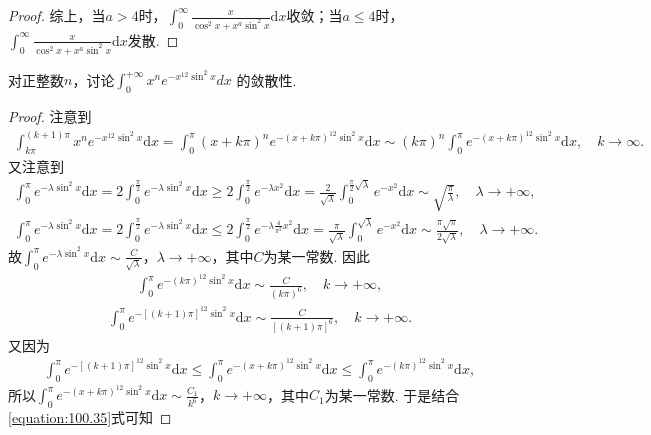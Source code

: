 \documentclass[../../main.tex]{subfiles}
\begin{document}
\begin{proof}
综上，当$a>4$时，$\int_0^{\infty}\frac{x}{\cos^2x+x^a\sin^2x}\mathrm{d}x$收敛；当$a\leqslant 4$时，$\int_0^{\infty}\frac{x}{\cos^2x+x^a\sin^2x}\mathrm{d}x$发散.
\end{proof}

\begin{example}
对正整数\(n\)，讨论$\int_{0}^{+\infty}x^{n}e^{-x^{12}\sin^{2}x}dx$
的敛散性. 
\end{example}
\begin{proof}
注意到
\begin{align}\label{equation:100.35}
\int_{k\pi}^{(k+1)\pi}x^ne^{-x^{12}\sin^2x}\mathrm{d}x=\int_0^{\pi}(x+k\pi)^ne^{-(x+k\pi)^{12}\sin^2x}\mathrm{d}x\sim (k\pi)^n\int_0^{\pi}e^{-(x+k\pi)^{12}\sin^2x}\mathrm{d}x,\quad k\rightarrow \infty.
\end{align}
又注意到
\begin{align*}
\int_0^{\pi}e^{-\lambda \sin^2x}\mathrm{d}x=2\int_0^{\frac{\pi}{2}}e^{-\lambda \sin^2x}\mathrm{d}x\geqslant 2\int_0^{\frac{\pi}{2}}e^{-\lambda x^2}\mathrm{d}x=\frac{2}{\sqrt{\lambda}}\int_0^{\frac{\pi}{2}\sqrt{\lambda}}e^{-x^2}\mathrm{d}x\sim \sqrt{\frac{\pi}{\lambda}},\quad \lambda \rightarrow +\infty,
\end{align*}
\begin{align*}
\int_0^{\pi}e^{-\lambda \sin^2x}\mathrm{d}x=2\int_0^{\frac{\pi}{2}}e^{-\lambda \sin^2x}\mathrm{d}x\leqslant 2\int_0^{\frac{\pi}{2}}e^{-\lambda \frac{4}{\pi^2}x^2}\mathrm{d}x=\frac{\pi}{\sqrt{\lambda}}\int_0^{\sqrt{\lambda}}e^{-x^2}\mathrm{d}x\sim \frac{\pi \sqrt{\pi}}{2\sqrt{\lambda}},\quad \lambda \rightarrow +\infty.
\end{align*}
故$\int_0^{\pi}e^{-\lambda \sin^2x}\mathrm{d}x\sim \frac{C}{\sqrt{\lambda}}$，$\lambda \rightarrow +\infty$，其中$C$为某一常数. 因此
\begin{align*}
\int_0^{\pi}e^{-(k\pi)^{12}\sin^2x}\mathrm{d}x\sim \frac{C}{(k\pi)^6},\quad k\rightarrow +\infty,
\end{align*}
\begin{align*}
\int_0^{\pi}e^{-[(k+1)\pi]^{12}\sin^2x}\mathrm{d}x\sim \frac{C}{[(k+1)\pi]^6},\quad k\rightarrow +\infty.
\end{align*}
又因为
\begin{align*}
\int_0^{\pi}e^{-[(k+1)\pi]^{12}\sin^2x}\mathrm{d}x\leqslant \int_0^{\pi}e^{-(x+k\pi)^{12}\sin^2x}\mathrm{d}x\leqslant \int_0^{\pi}e^{-(k\pi)^{12}\sin^2x}\mathrm{d}x,
\end{align*}
所以$\int_0^{\pi}e^{-(x+k\pi)^{12}\sin^2x}\mathrm{d}x\sim \frac{C_1}{k^6}$，$k\rightarrow +\infty$，其中$C_1$为某一常数. 于是结合\eqref{equation:100.35}式可知

\end{proof}
\end{document}
